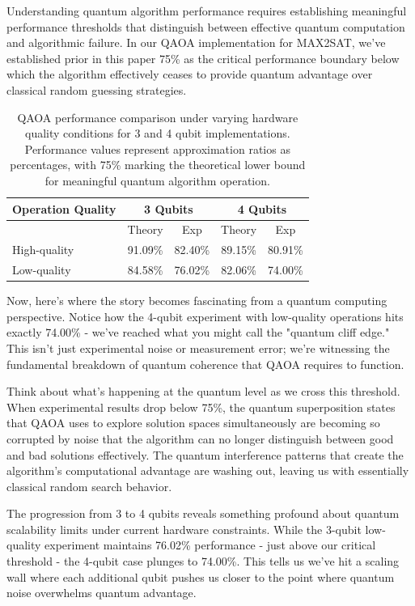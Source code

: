 \documentclass[%
 reprint,
 amsmath,amssymb,
 aps,
]{revtex4-2}
\begin{document}
Understanding quantum algorithm performance requires establishing meaningful performance thresholds that distinguish between effective quantum computation and algorithmic failure. In our QAOA implementation for MAX2SAT, we've established prior in this paper 75\% as the critical performance boundary below which the algorithm effectively ceases to provide quantum advantage over classical random guessing strategies.

\begin{table}[h]
\centering
\caption{QAOA performance comparison under varying hardware quality conditions for 3 and 4 qubit implementations. Performance values represent approximation ratios as percentages, with 75\% marking the theoretical lower bound for meaningful quantum algorithm operation.}
\label{tab:hardware_quality}
\begin{tabular}{|l|c|c|c|c|}
\hline
Operation Quality & \multicolumn{2}{c|}{3 Qubits} & \multicolumn{2}{c|}{4 Qubits} \\
\hline
 & Theory & Exp & Theory & Exp \\
\hline
High-quality & 91.09\% & 82.40\% & 89.15\% & 80.91\% \\
\hline
Low-quality & 84.58\% & 76.02\% & 82.06\% & 74.00\% \\
\hline
\end{tabular}
\end{table}

Now, here's where the story becomes fascinating from a quantum computing perspective. Notice how the 4-qubit experiment with low-quality operations hits exactly 74.00\% - we've reached what you might call the "quantum cliff edge." This isn't just experimental noise or measurement error; we're witnessing the fundamental breakdown of quantum coherence that QAOA requires to function.

Think about what's happening at the quantum level as we cross this threshold. When experimental results drop below 75\%, the quantum superposition states that QAOA uses to explore solution spaces simultaneously are becoming so corrupted by noise that the algorithm can no longer distinguish between good and bad solutions effectively. The quantum interference patterns that create the algorithm's computational advantage are washing out, leaving us with essentially classical random search behavior.

The progression from 3 to 4 qubits reveals something profound about quantum scalability limits under current hardware constraints. While the 3-qubit low-quality experiment maintains 76.02\% performance - just above our critical threshold - the 4-qubit case plunges to 74.00\%. This tells us we've hit a scaling wall where each additional qubit pushes us closer to the point where quantum noise overwhelms quantum advantage.
\end{document}
